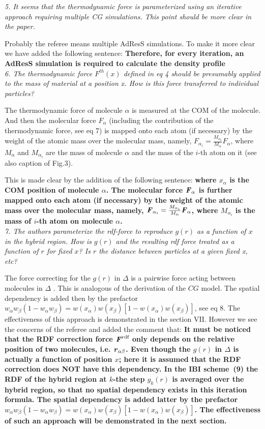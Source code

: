\documentclass[a4paper]{article}
\renewcommand{\v}[1]{\textbf{\textit{#1}}}
\begin{document}
\textit{
5. It seems that the thermodynamic force is parameterized using an
iterative approach requiring multiple CG simulations. This point
should be more clear in the paper.
}

Probably the referee means multiple AdResS simulations. To make it more clear we have added the following sentence: {\bf Therefore, for every iteration, an AdResS simulation is required to calculate the density profile}
\\

\textit{
6. The thermodynamic force $F^{th}(x)$ defined in eq 4 should be
presumably applied to the mass of material at a position x. How is
this force transferred to individual particles?
}

The thermodynamic force of molecule $\alpha$ is measured at the COM of
the molecule.  And then the molecular force ${F}_{\alpha}$ (including
the contribution of the thermodynamic force, see eq 7) is 
mapped onto each atom (if necessary) by the weight of the atomic mass
over the molecular mass, namely, $F_{\alpha_i} =
\frac{M_{\alpha_i}}{M_\alpha}F_{\alpha}$, where $M_{\alpha}$ and
$M_{\alpha_i}$ are the mass of molecule $\alpha$ and the mass of the
$i$-th atom on it (see also caption of Fig.3).

This is made clear by the addition of the following sentence: {\bf 
  where $x_\alpha$ is the COM position of molecule $\alpha$.
  The molecular force ${\v F}_{\alpha}$ 
  is further mapped onto each atom (if necessary) by the weight
of the atomic mass over the molecular mass, namely,
$\v F_{\alpha_i} = \frac{M_{\alpha_i}}{M_\alpha}\v F_{\alpha}$, where
$M_{\alpha_i}$ is the mass of $i$-th atom on molecule $\alpha$.}
\\

\textit{
7. The authors parameterize the rdf-force to reproduce $g(r)$ as a
function of $x$ in the hybrid region. How is $g(r)$ and the resulting rdf
force treated as a function of $r$ for fixed $x$? Is $r$ the distance
between particles at a given fixed x, etc?
}

The force correcting for the $g(r)$ in $\Delta$ is a pairwise force acting between molecules in $\Delta$ . This is analogous of the derivation of the $CG$ model. 
The spatial dependency is
added then by the prefactor $ w_\alpha w_\beta (1-w_\alpha w_\beta)
= w(x_\alpha) w(x_\beta) [1-w(x_\alpha) w(x_\beta)]$, see eq 8.
The effectiveness of this approach is demonstrated in the section VII.
However we see the concerns of the referee and added the comment that: {\bf It must be noticed that the RDF correction force $\v F^{\textrm{rdf}}$
  only depends on the
  relative position of two molecules, i.e. $\v r_{\alpha\beta}$.  Even though
  the $g(r)$ in $\Delta$ is actually a function of position $x$; here it is assumed that the RDF correction does NOT have this dependency.
  In the IBI scheme~(9)
  the RDF of the hybrid region at $k$-the step $g_k(r)$ is 
  averaged over the hybrid region, so that no spatial
  dependency exists in this iteration formula.
  The spatial dependency is added latter by the  prefactor
  $ w_\alpha w_\beta (1-w_\alpha w_\beta) = w(x_\alpha) w(x_\beta) [1-w(x_\alpha) w(x_\beta)]$.
  The effectiveness of such an approach will be demonstrated in the next section.}
\\
\end{document}
